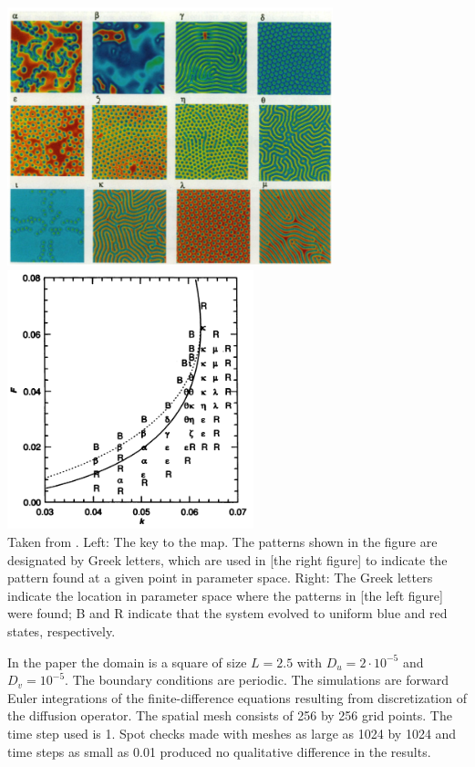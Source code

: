 \begin{center}
\includegraphics[height=7.5cm]{python_codes/fieldstone_171/images/pear93a}
\includegraphics[height=7.5cm]{python_codes/fieldstone_171/images/pear93b}\\
{\captionfont Taken from \cite{pear93}. Left: The key to the map. The patterns 
shown in the figure are designated by Greek letters, which are used in 
[the right figure] to indicate the pattern found at a given point in parameter space.
Right: The Greek letters indicate the location in parameter
space where the patterns in [the left figure] were found; B and R indicate that
the system evolved to uniform blue and red states, respectively.
} 
\end{center}

In the paper the domain is a square of size $L=2.5$ with $D_u=2\cdot 10^{-5}$
and $D_v=10^{-5}$. The boundary conditions are periodic.
The simulations are forward Euler integrations of the finite-difference equations 
resulting from discretization of the diffusion operator. The spatial mesh consists of 256 by 256
grid points. The time step used is 1. Spot checks made with meshes as large as 1024 by
1024 and time steps as small as 0.01 produced no qualitative difference in the results.

